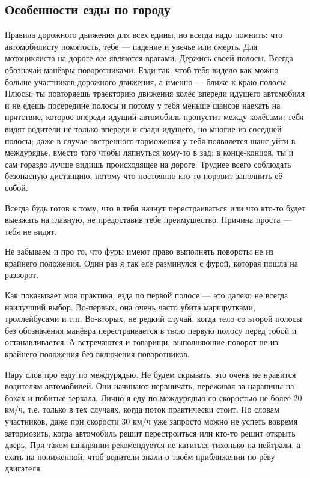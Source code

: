 \documentclass[12pt,a4paper]{article}
\begin{document}
\subsection{Особенности езды по городу}

Правила дорожного движения для всех едины, но всегда надо помнить:
что автомобилисту помятость, тебе --- падение и увечье или смерть.
Для мотоциклиста на дороге \emph{все} являются врагами.
Держись своей полосы. Всегда обозначай манёвры поворотниками.
Езди так, чтоб тебя видело как можно больше участников дорожного
движения, а именно --- ближе к краю полосы. Плюсы: ты повторяешь
траекторию движения колёс впереди идущего автомобиля и не едешь
посередине полосы и потому у тебя меньше шансов наехать на прятствие,
которое впереди идущий автомобиль пропустит между колёсами; тебя
видят водители не только впереди и сзади идущего, но многие из
соседней полосы; даже в случае экстренного торможения у тебя
появляется шанс уйти в междурядье, вместо того чтобы ляпнуться
кому-то в зад; в конце-концов, ты и сам гораздо лучше видишь
происходящее на дороге.
Труднее всего соблюдать безопасную дистанцию, потому что постоянно
кто-то норовит заполнить её собой.

Всегда будь готов к тому, что в тебя начнут перестраиваться или
что кто-то будет выезжать на главную, не предоставив тебе
преимущество. Причина проста --- тебя не видят.

Не забываем и про то, что фуры имеют право
выполнять повороты не из крайнего положения. Один раз я так еле
разминулся с фурой, которая пошла на разворот.

Как показывает моя практика, езда по первой полосе --- это далеко
не всегда наилучший выбор. Во-первых, она очень часто убита маршрутками,
троллейбусами и т.п. Во-вторых, не редкий случай, когда тело со второй
полосы без обозначения манёвра перестраивается в твою первую полосу
перед тобой и останавливается. А встречаются и товарищи, выполняющие
поворот не из крайнего положения без включения поворотников.

Пару слов про езду по междурядью. Не будем скрывать, это очень не
нравится водителям автомобилей. Они начинают нервничать, переживая
за царапины на боках и побитые зеркала. Лично я еду по междурядью со
скоростью не более 20 км/ч, т.е. только в тех случаях, когда поток
практически стоит. По словам участников, даже при скорости 30 км/ч
уже запросто можно не успеть вовремя затормозить, когда автомобиль
решит перестроиться или кто-то решит открыть дверь. При таком
шнырянии рекомендуется не катиться тихонько на нейтрали, а ехать
на пониженной, чтоб водители знали о твоём приближении по рёву
двигателя.
\end{document}
